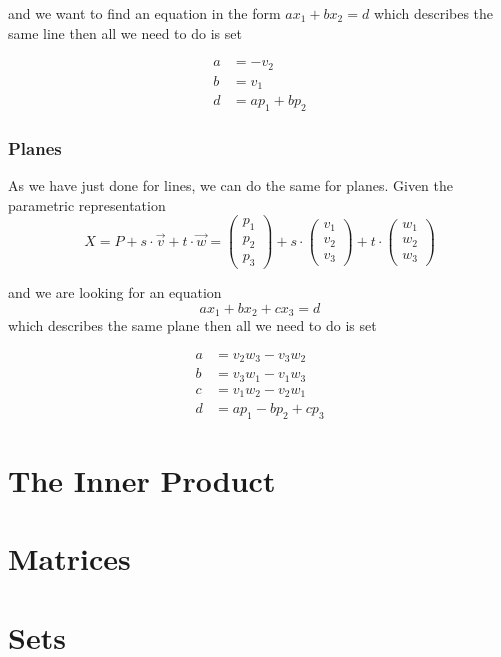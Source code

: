 \documentclass{article}
\begin{document}
	and we want to find an equation in the form $ax_{1} + bx_{2} = d$ which describes the same line then all we need to do is set 
	
	\begin{align*}
	a &= -v_{2}\\
	b &= v_{1}\\
	d &= ap_{1} + bp_{2}
	\end{align*}
	
	\subsubsection{Planes}
	As we have just done for lines, we can do the same for planes. Given the parametric representation
	\[ X = P + s \cdot \overrightarrow{v} + t \cdot \overrightarrow{w} = \left( \begin{array}{c} p_{1} \\ p_{2} \\ p_{3} \end{array} \right) + s \cdot \left( \begin{array}{c} v_{1} \\ v_{2} \\ v_{3} \end{array} \right) + t \cdot \left( \begin{array}{c} w_{1} \\ w_{2} \\ w_{3} \end{array} \right) \]
	
	and we are looking for an equation \[ax_{1} + bx_{2} + cx_{3} = d \] which describes the same plane then all we need to do is set
	
	\begin{align*}
	a &= v_{2}w_{3} - v_{3}w_{2} \\
	b &= v_{3}w_{1} - v_{1}w_{3} \\
	c &= v_{1}w_{2} - v_{2}w_{1} \\
	d &= ap_{1} - bp_{2} + cp_{3}
	\end{align*}		
	
	\section{The Inner Product}	
	
	\section{Matrices}
	
	\section{Sets}
\end{document}
